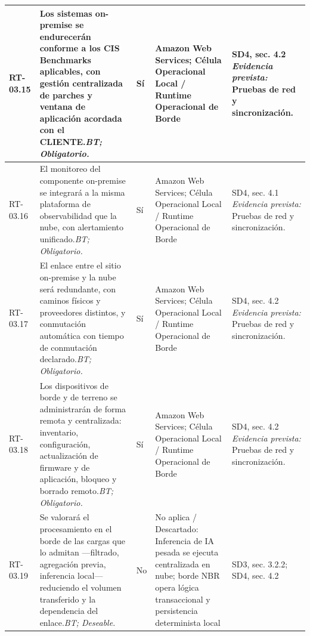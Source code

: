 \begin{paginaHorizontalSynaptix}
\begin{longtable}{|L{0.09\AnchoMatrizTDoce}|L{0.385\AnchoMatrizTDoce}|L{0.065\AnchoMatrizTDoce}|L{0.18\AnchoMatrizTDoce}|L{0.28\AnchoMatrizTDoce}|}
RT-\allowbreak{}03.\allowbreak{}15 &
Los sistemas on-premise se endurecerán conforme a los CIS Benchmarks aplicables, con gestión centralizada de parches y ventana de aplicación acordada con el CLIENTE.\newline\textit{BT; Obligatorio.} &
Sí &
Amazon Web Services; Célula Operacional Local / Runtime Operacional de Borde &
SD4, sec. 4.2 \newline\textit{Evidencia prevista:} Pruebas de red y sincronización. \\ \hline

RT-\allowbreak{}03.\allowbreak{}16 &
El monitoreo del componente on-premise se integrará a la misma plataforma de observabilidad que la nube, con alertamiento unificado.\newline\textit{BT; Obligatorio.} &
Sí &
Amazon Web Services; Célula Operacional Local / Runtime Operacional de Borde &
SD4, sec. 4.1 \newline\textit{Evidencia prevista:} Pruebas de red y sincronización. \\ \hline

RT-\allowbreak{}03.\allowbreak{}17 &
El enlace entre el sitio on-premise y la nube será redundante, con caminos físicos y proveedores distintos, y conmutación automática con tiempo de conmutación declarado.\newline\textit{BT; Obligatorio.} &
Sí &
Amazon Web Services; Célula Operacional Local / Runtime Operacional de Borde &
SD4, sec. 4.2 \newline\textit{Evidencia prevista:} Pruebas de red y sincronización. \\ \hline

RT-\allowbreak{}03.\allowbreak{}18 &
Los dispositivos de borde y de terreno se administrarán de forma remota y centralizada: inventario, configuración, actualización de firmware y de aplicación, bloqueo y borrado remoto.\newline\textit{BT; Obligatorio.} &
Sí &
Amazon Web Services; Célula Operacional Local / Runtime Operacional de Borde &
SD4, sec. 4.2 \newline\textit{Evidencia prevista:} Pruebas de red y sincronización. \\ \hline

RT-\allowbreak{}03.\allowbreak{}19 &
Se valorará el procesamiento en el borde de las cargas que lo admitan —filtrado, agregación previa, inferencia local— reduciendo el volumen transferido y la dependencia del enlace.\newline\textit{BT; Deseable.} &
No &
No aplica / Descartado: Inferencia de IA pesada se ejecuta centralizada en nube; borde NBR opera lógica transaccional y persistencia determinista local &
SD3, sec. 3.2.2; SD4, sec. 4.2 \\ \hline


\end{longtable}
\end{paginaHorizontalSynaptix}
